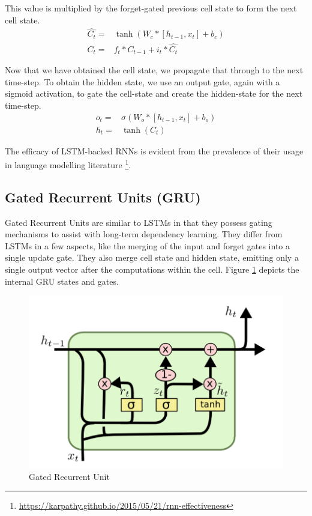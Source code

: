 This value is multiplied by the forget-gated previous cell state to form the next cell state.
\begin{align*}
	\hat{C_t} =
	 & \tanh(W_c*[h_{t-1}, x_t] + b_c) \\
	C_t =
	 & f_t * C_{t-1} + i_t * \hat{C_t}
\end{align*}

Now that we have obtained the cell state, we propagate that through to the next time-step. To obtain the hidden state, we use an output gate, again with a sigmoid activation, to gate the cell-state and create the hidden-state for the next time-step.
\begin{align*}
	o_t =
	 & \sigma(W_o*[h_{t-1}, x_t] + b_o) \\
	h_t =
	 & \tanh(C_t)
\end{align*}

The efficacy of LSTM-backed RNNs is evident from the prevalence of their usage in language modelling literature \citep{sundermeyer2012lstm,gers2001lstm,graves2005framewise} \footnote{\url{https://karpathy.github.io/2015/05/21/rnn-effectiveness}}.

\subsection{Gated Recurrent Units (GRU)}

Gated Recurrent Units \citep{cho2014learning} are similar to LSTMs in that they possess gating mechanisms to assist with long-term dependency learning. They differ from LSTMs in a few aspects, like the merging of the input and forget gates into a single update gate. They also merge cell state and hidden state, emitting only a single output vector after the computations within the cell. Figure \ref{fig:gru} depicts the internal GRU states and gates.

\begin{figure}[ht]
	\centering
	\includegraphics[width=\textwidth]{images/gru}
	\caption{\label{fig:gru} Gated Recurrent Unit}
\end{figure}

